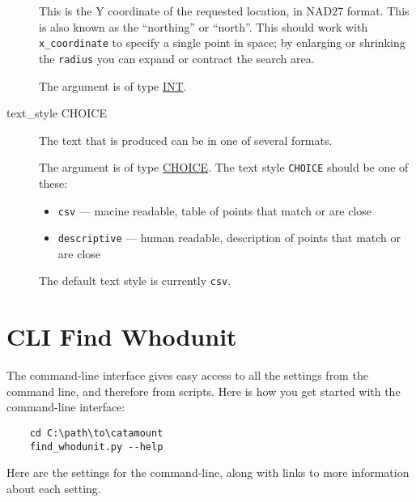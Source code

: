 \begin{description}
This is the Y coordinate of the requested location, in NAD27 format.
This is also known as the ``northing'' or ``north''. This should work
with \texttt{x\_coordinate} to specify a single point in space; by
enlarging or shrinking the \texttt{radius} you can expand or contract
the search area.

The argument is of type \hyperlink{argument-type-int}{INT}.

\item[text\_style CHOICE]
\hypertarget{whodunit-text-style}{}

The text that is produced can be in one of several formats.

The argument is of type \hyperlink{argument-type-choice}{CHOICE}. The text
style \texttt{CHOICE} should be one of these:

\begin{itemize}
\item \verb=csv= --- macine readable, table of points that match or are close
\item \verb=descriptive= --- human readable, description of points that match or are close
\end{itemize}

The default text style is currently \texttt{csv}.

\end{description}


\section{CLI Find Whodunit}

The command-line interface gives easy access to all the settings from the
command line, and therefore from scripts. Here is how you get started with
the command-line interface:

\begin{verbatim}
    cd C:\path\to\catamount
    find_whodunit.py --help
\end{verbatim}

Here are the settings for the command-line, along with links to
more information about each setting.

